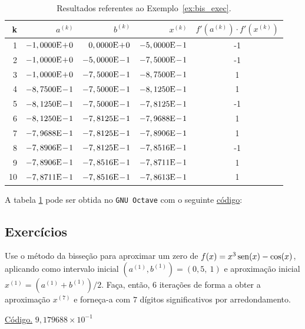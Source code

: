 \begin{ex}
\begin{table}[h!]
  \centering
  \caption{Resultados referentes ao Exemplo~\ref{ex:bis_exec}.}
  \begin{tabular}{r|rr|r|c}
    k & $a^{(k)}$ & $b^{(k)}$ & $x^{(k)}$ & $f'(a^{(k)})\cdot f'(x^{(k)})$\\\hline
    1 & $-1,0000\mathrm{E}\!+\!0$ & $0,0000\mathrm{E}\!+\!0$ & $-5,0000\mathrm{E}\!-\!1$ & -1 \\
    2 & $-1,0000\mathrm{E}\!+\!0$ & $-5,0000\mathrm{E}\!-\!1$ & $-7,5000\mathrm{E}\!-\!1$ & -1 \\
    3 & $-1,0000\mathrm{E}\!+\!0$ & $-7,5000\mathrm{E}\!-\!1$ & $-8,7500\mathrm{E}\!-\!1$ & 1 \\
    4 & $-8,7500\mathrm{E}\!-\!1$ & $-7,5000\mathrm{E}\!-\!1$ & $-8,1250\mathrm{E}\!-\!1$ &  1 \\
    5 & $-8,1250\mathrm{E}\!-\!1$ & $-7,5000\mathrm{E}\!-\!1$ & $-7,8125\mathrm{E}\!-\!1$ & -1 \\
    6 & $-8,1250\mathrm{E}\!-\!1$ & $-7,8125\mathrm{E}\!-\!1$ & $-7,9688\mathrm{E}\!-\!1$ & 1 \\
    7 & $-7,9688\mathrm{E}\!-\!1$ & $-7,8125\mathrm{E}\!-\!1$ & $-7,8906\mathrm{E}\!-\!1$ & 1 \\
    8 & $-7,8906\mathrm{E}\!-\!1$ & $-7,8125\mathrm{E}\!-\!1$ & $-7,8516\mathrm{E}\!-\!1$ & -1 \\
    9 & $-7,8906\mathrm{E}\!-\!1$ & $-7,8516\mathrm{E}\!-\!1$ & $-7,8711\mathrm{E}\!-\!1$ & 1 \\
    10 & $-7,8711\mathrm{E}\!-\!1$ & $-7,8516\mathrm{E}\!-\!1$ & $-7,8613\mathrm{E}\!-\!1$ & 1 \\\hline
  \end{tabular}
  \label{tab:bis_multpar}
\end{table}

\ifisoctave
A tabela \ref{tab:bis_multpar} pode ser obtida no \verb+GNU Octave+ com o seguinte \href{https://github.com/phkonzen/notas/blob/master/src/MatematicaNumerica/cap_eq1d/dados/ex_bis_multpar/ex_bis_multpar.m}{código}:

\fi
\end{ex}

\subsection*{Exercícios}

\begin{exer}\label{exer:bis_1}
  Use o método da bisseção para aproximar um zero de $f(x)=x^3\operatorname{sen}(x)-\cos(x)$, aplicando como intervalo inicial $(a^{(1)}, b^{(1)}) = (0,5, ~1)$ e aproximação inicial $x^{(1)}=(a^{(1)}+b^{(1)})/2$. Faça, então, $6$ iterações de forma a obter a aproximação $x^{(7)}$ e forneça-a com $7$ dígitos significativos por arredondamento.
\end{exer}
\begin{resp}
    \ifisoctave 
  \href{https://github.com/phkonzen/notas/blob/master/src/MatematicaNumerica/cap_eq1d/dados/exer_bis_1/exer_bis_1.m}{Código.} 
  \fi
  $9,179688\times 10^{-1}$
\end{resp}

